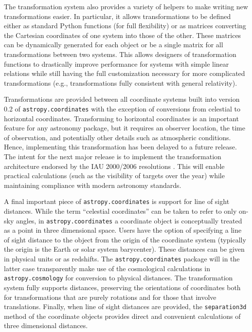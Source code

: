 \documentclass[traditabstract]{aa}
\begin{document}
The transformation system also provides a variety of helpers to make writing
new transformations easier.  In particular, it allows transformations to be
defined either as standard Python functions (for full flexibility) or as
matrices converting the Cartesian coordinates of one system into those of the
other. These matrices can be dynamically generated for each object or be a
single matrix for all transformations between two systems. This allows
designers of transformation functions to drastically improve performance for
systems with simple linear relations while still having the full
customization necessary for more complicated transformations (e.g.,
transformations fully consistent with general relativity).

Transformations are provided between all coordinate systems built into
version 0.2 of \texttt{astropy.coordinates} with the exception of conversions from
celestial to horizontal coordinates. Transforming to horizontal
coordinates is an important feature for any astronomy package,
but it requires an observer location, the time of observation,
and potentially other details such as atmospheric conditions.
Hence, implementing this transformation has been delayed to a
future release. The intent for the next major release is to implement the
transformation architecture endorsed by the IAU 2000/2006 resolutions
\citep[see e.g.,][]{soffel03, usnocircular179}. This will enable practical
calculations (such as the visibility of targets over the year) while maintaining
compliance with modern astronomy standards.


A final important piece of \texttt{astropy.coordinates} is support for
line of sight distances. While the term ``celestial coordinates'' can be
taken to refer to only on-sky angles, in \texttt{astropy.coordinates} a
coordinate object is conceptually treated as a point in three dimensional space.
Users have the option of specifying a line of sight distance to the
object from the origin of the coordinate system (typically the origin is the
Earth or solar system barycenter). These distances can be given in physical
units or as redshifts. The \texttt{astropy.coordinates} package will in the
latter case transparently make use of the cosmological calculations in \texttt{astropy.cosmology} for
conversion to physical distances.
The transformation system fully supports distances, preserving
the orientations of coordinates both for transformations that are purely
rotations and for those that involve translations.  Finally, when
line of sight distances are provided, the \texttt{separation3d} method of the
coordinate objects provides direct and convenient calculations of
three dimensional distances.
\end{document}
